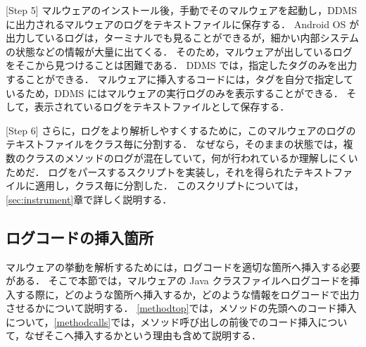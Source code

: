 [Step 5] マルウェアのインストール後，手動でそのマルウェアを起動し，DDMS に出力されるマルウェアのログをテキストファイルに保存する．
Android OS が出力しているログは，ターミナルでも見ることができるが，細かい内部システムの状態などの情報が大量に出てくる．
そのため，マルウェアが出しているログをそこから見つけることは困難である．
DDMS では，指定したタグのみを出力することができる．
マルウェアに挿入するコードには，タグを自分で指定しているため，DDMS にはマルウェアの実行ログのみを表示することができる．
そして，表示されているログをテキストファイルとして保存する．

[Step 6] さらに，ログをより解析しやすくするために，このマルウェアのログのテキストファイルをクラス毎に分割する．
なぜなら，そのままの状態では，複数のクラスのメソッドのログが混在していて，何が行われているか理解しにくいためだ．
ログをパースするスクリプトを実装し，それを得られたテキストファイルに適用し，クラス毎に分割した．
このスクリプトについては， \ref{sec:instrument}章で詳しく説明する．

\subsection{ログコードの挿入箇所}
\label{placeinsert}
マルウェアの挙動を解析するためには，ログコードを適切な箇所へ挿入する必要がある．
そこで本節では，マルウェアの Java クラスファイルへログコードを挿入する際に，どのような箇所へ挿入するか，どのような情報をログコードで出力させるかについて説明する．
\ref{methodtop}では，メソッドの先頭へのコード挿入について，\ref{methodcalls}では，メソッド呼び出しの前後でのコード挿入について，なぜそこへ挿入するかという理由も含めて説明する．

